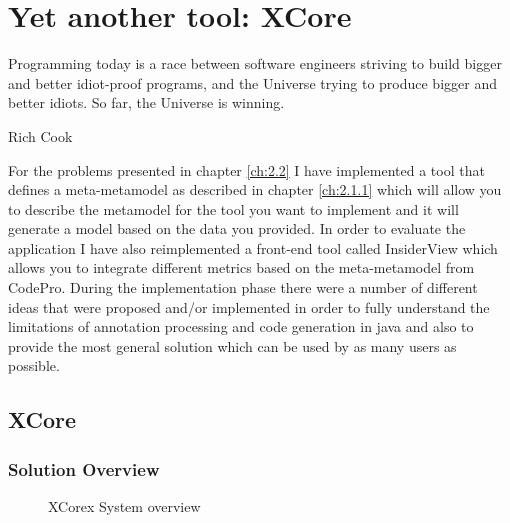 \chapter{Yet another tool: XCore }\label{ch:3}

\epigraph{Programming today is a race between software engineers striving to
build bigger and better idiot-proof programs, and the Universe trying to produce
bigger and better idiots. So far, the Universe is winning.}{Rich Cook}

	For the problems presented in chapter \ref{ch:2.2} I have implemented a tool
that defines a meta-metamodel as described in chapter \ref{ch:2.1.1} which will
allow you to describe the metamodel for the tool you want to implement and it will generate 
a model based on the data you provided. In order to evaluate the application I
have also reimplemented a front-end tool called InsiderView \cite{tools:iPlasma}
which allows you to integrate different metrics based on the meta-metamodel from 
CodePro.
	During the implementation phase there were a number of different ideas
that were proposed and/or implemented in order to fully understand the
limitations of annotation processing and code generation in java and also to
provide the most general solution which can be used by as many users as
possible.

\section{XCore}

\subsection{Solution Overview}
	 
\begin{figure}
\centering
{}
\caption{XCorex System overview}
\label{fig:XCoreSystem}
\end{figure}

